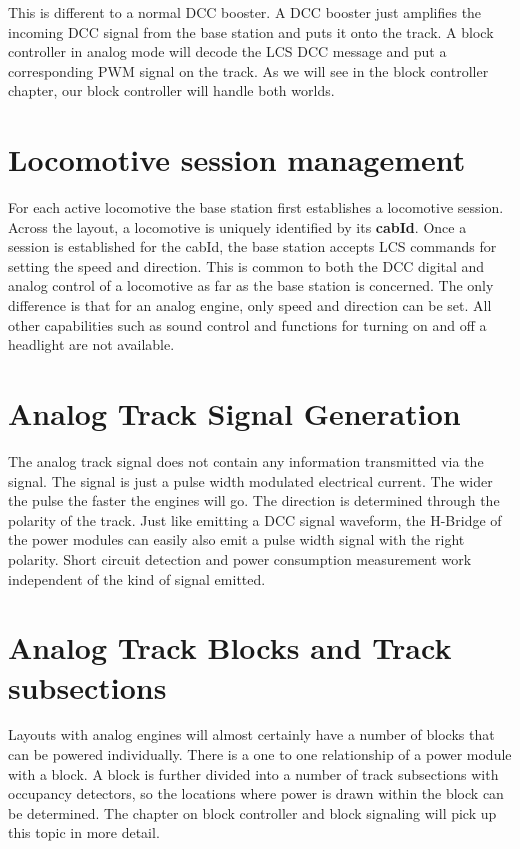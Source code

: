 This is different to a normal DCC booster. A DCC booster just amplifies the incoming DCC signal from the base station and puts it onto the track. A block controller in analog mode will decode the LCS DCC message and put a corresponding PWM signal on the track. As we will see in the block controller chapter, our block controller will handle both worlds.

\section{Locomotive session management}

For each active locomotive the base station first establishes a locomotive session. Across the layout, a locomotive is uniquely identified by its \textbf{cabId}. Once a session is established for the cabId, the base station accepts LCS commands for setting the speed and direction. This is common to both the DCC digital and analog control of a locomotive as far as the base station is concerned. The only difference is that for an analog engine, only speed and direction can be set. All other capabilities such as sound control and functions for turning on and off a headlight are not available.

\section{Analog Track Signal Generation}

The analog track signal does not contain any information transmitted via the signal. The signal is just a pulse width modulated electrical current. The wider the pulse the faster the engines will go. The direction is determined through the polarity of the track. Just like emitting a DCC signal waveform, the H-Bridge of the power modules can easily also emit a pulse width signal with the right polarity. Short circuit detection and power consumption measurement work independent of the kind of signal emitted.

\section{Analog Track Blocks and Track subsections}

Layouts with analog engines will almost certainly have a number of blocks that can be powered individually. There is a one to one relationship of a power module with a block. A block is further divided into a number of track subsections with occupancy detectors, so the locations where power is drawn within the block can be determined. The chapter on block controller and block signaling will pick up this topic in more detail.

